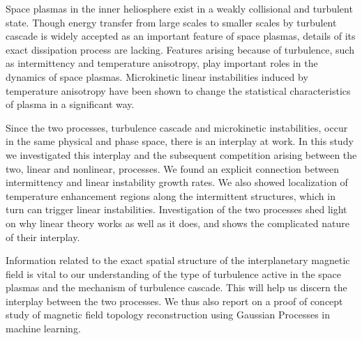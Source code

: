 %
%
Space plasmas in the inner heliosphere exist in a weakly collisional and turbulent state. Though
energy transfer from large scales to smaller scales by turbulent cascade is widely accepted as an
important feature of space plasmas, details of its exact dissipation process are lacking. Features
arising because of turbulence, such as intermittency and temperature anisotropy, play important
roles in the dynamics of space plasmas. Microkinetic linear instabilities induced by temperature
anisotropy have been shown to change the statistical characteristics of plasma in a significant way.

Since the two processes, turbulence cascade and microkinetic instabilities, occur in the same
physical and phase space, there is an interplay at work. In this study we investigated this
interplay and the subsequent competition arising between the two, linear and nonlinear, processes.
We found an explicit connection between intermittency and linear instability growth rates. We also
showed localization of temperature enhancement regions along the intermittent structures, which in
turn can trigger linear instabilities. Investigation of the two processes shed light on why linear
theory works as well as it does, and shows the complicated nature of their interplay.

Information related to the exact spatial structure of the interplanetary magnetic field is vital to
our understanding of the type of turbulence active in the space plasmas and the mechanism of
turbulence cascade. This will help us discern the interplay between the two processes. We thus also
report on a proof of concept study of magnetic field topology reconstruction using Gaussian
Processes in machine learning.